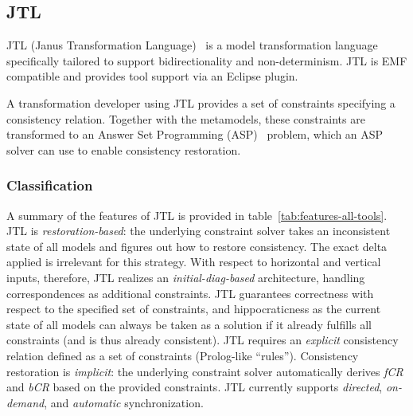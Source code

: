 \subsection{JTL}
\label{sec:JTL}


JTL (Janus Transformation Language)~\cite{CDEP10,ErPT18} is a model transformation language specifically tailored to support bidirectionality and non-determinism.
JTL is EMF compatible and provides tool support via an Eclipse plugin.

A transformation developer using JTL provides a set of constraints specifying a consistency relation.
Together with the metamodels, these constraints are transformed to an Answer Set Programming (ASP)~\cite{GL88} problem, which an ASP solver can use to enable consistency restoration.


\subsubsection{Classification}
A summary of the features of JTL is provided in table~\ref{tab:features-all-tools}.
JTL is \emph{restoration-based}: the underlying constraint solver takes an inconsistent state of all models and figures out how to restore consistency.
The exact delta applied is irrelevant for this strategy.
%
With respect to horizontal and vertical inputs, therefore, JTL realizes an \emph{initial-diag-based} architecture, handling correspondences as additional constraints. 
%
JTL guarantees correctness with respect to the specified set of constraints, and hippocraticness as the current state of all models can always be taken as a solution if it already fulfills all constraints (and is thus already consistent).
%
JTL requires an \emph{explicit} consistency relation defined as a set of constraints (Prolog-like ``rules'').
%
Consistency restoration is \emph{implicit}:  the underlying constraint solver automatically derives \emph{fCR} and \emph{bCR} based on the provided constraints.
%
JTL currently supports \emph{directed}, \emph{on-demand}, and \emph{automatic} synchronization.

